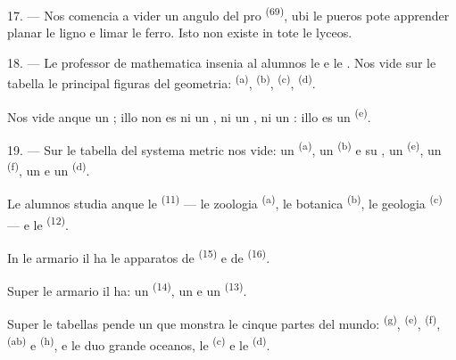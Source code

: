 17. --- Nos comencia a vider un angulo del  pro  \textsuperscript{(69)}, ubi le pueros pote apprender planar le ligno e
limar le ferro. Isto non existe in tote le lyceos.

\VUsaut{5.0mm}
\VUsaut{3.6mm}

18. --- Le professor de mathematica insenia al alumnos le  e le . Nos vide sur le tabella
le principal figuras del geometria:  \textsuperscript{(a)},
 \textsuperscript{(b)}, 
\textsuperscript{(c)},  \textsuperscript{(d)}.

Nos vide anque un ; illo non es ni un , ni un
, ni un : illo es un
 \textsuperscript{(e)}.

19. --- Sur le tabella del systema metric nos vide: un 
\textsuperscript{(a)}, un  \textsuperscript{(b)} e su
, un  \textsuperscript{(e)}, un 
\textsuperscript{(f)}, un  e un 
\textsuperscript{(d)}.

Le alumnos studia anque le  \textsuperscript{(11)} ---
le zoologia \textsuperscript{(a)}, le botanica \textsuperscript{(b)}, le
geologia \textsuperscript{(c)} --- e le 
\textsuperscript{(12)}.

In le armario il ha le apparatos de  \textsuperscript{(15)} e de
 \textsuperscript{(16)}.

Super le armario il ha: un  \textsuperscript{(14)}, un
 e un  \textsuperscript{(13)}.

Super le tabellas pende un  que monstra le cinque partes del
mundo:  \textsuperscript{(g)}, 
\textsuperscript{(e)},  \textsuperscript{(f)}, 
\textsuperscript{(ab)} e  \textsuperscript{(h)}, e le duo grande
oceanos, le  \textsuperscript{(c)} e le 
\textsuperscript{(d)}.
\VUsaut{6.0mm}
\VUfilet{22mm}
